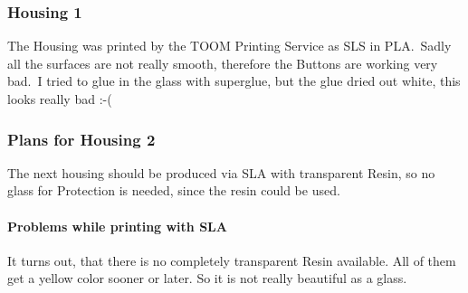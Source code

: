 \subsubsection{Housing 1}
The Housing was printed by the TOOM Printing Service as SLS in PLA.\
Sadly all the surfaces are not really smooth, therefore the Buttons are working very bad.\
I tried to glue in the glass with superglue, but the glue dried out white, this looks really bad :-(\

\subsubsection{Plans for Housing 2}
The next housing should be produced via SLA with transparent Resin, so no glass for Protection is needed, 
since the resin could be used.
\paragraph{Problems while printing with SLA}
It turns out, that there is no completely transparent Resin available. All of them get a yellow color sooner or later.
So it is not really beautiful as a glass.

